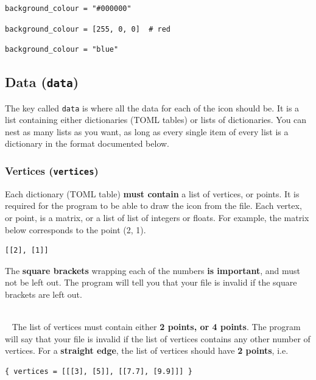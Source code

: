 \documentclass[11pt]{article}
\begin{document}
\begin{verbatim}
background_colour = "#000000"
\end{verbatim}

\begin{verbatim}
background_colour = [255, 0, 0]  # red
\end{verbatim}

\begin{verbatim}
background_colour = "blue"
\end{verbatim}

\subsection{Data (\texttt{data})}
\label{sec:orgbbdd602}
The key called \texttt{data} is where all the data for each of the icon should be. It is a list containing either dictionaries (TOML tables) or lists of dictionaries. You can nest as many lists as you want, as long as every single item of every list is a dictionary in the format documented below.

 \newpage

\subsubsection{Vertices (\texttt{vertices})}
\label{sec:org24696b8}
Each dictionary (TOML table) \textbf{must contain} a list of vertices, or points. It is required for the program to be able to draw the icon from the file. Each vertex, or point, is a matrix, or a list of list of integers or floats. For example, the matrix below corresponds to the point (2, 1).
\begin{verbatim}
[[2], [1]]
\end{verbatim}

 \noindent The \textbf{square brackets} wrapping each of the numbers \textbf{is important}, and must not be left out. The program will tell you that your file is invalid if the square brackets are left out.

 ~\\~ \noindent The list of vertices must contain either \textbf{2 points, or 4 points}. The program will say that your file is invalid if the list of vertices contains any other number of vertices. For a \textbf{straight edge}, the list of vertices should have \textbf{2 points}, i.e.
\begin{verbatim}
{ vertices = [[[3], [5]], [[7.7], [9.9]]] }
\end{verbatim}
\end{document}
